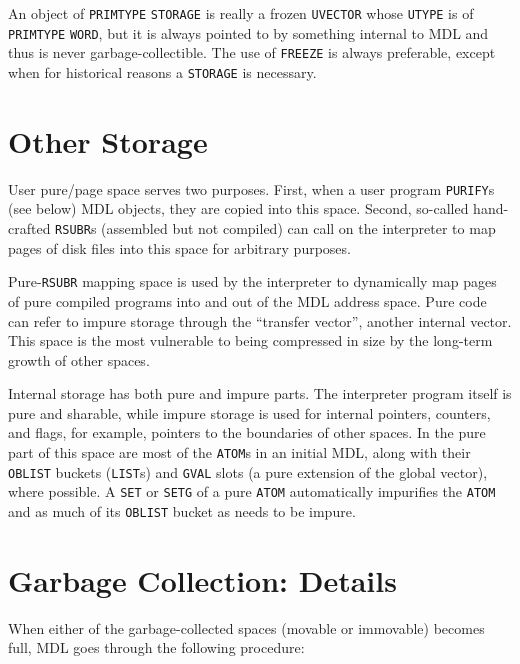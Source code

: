 \documentclass[a4paper]{scrbook}
\begin{document}
An object of \texttt{PRIMTYPE} \texttt{STORAGE} is really a frozen \texttt{UVECTOR} whose
\texttt{UTYPE} is of \texttt{PRIMTYPE} \texttt{WORD}, but it is always pointed to by something internal to MDL and thus is
never garbage-collectible. The use of \texttt{FREEZE} is always preferable, except when for historical reasons a
\texttt{STORAGE} is necessary.

\section{Other Storage}\label{other-storage}

User pure/page space serves two purposes. First, when a user program \texttt{PURIFY}s (see below)
MDL objects, they are copied into this space. Second, so-called hand-crafted \texttt{RSUBR}s
(assembled but not compiled) can call on the interpreter to map pages of disk files into this space for arbitrary purposes.

Pure-\texttt{RSUBR} mapping space is used by the interpreter to dynamically map pages of pure compiled programs into and
out of the MDL address space. Pure code can refer to impure storage through the ``transfer vector'', another internal
vector. This space is the most vulnerable to being compressed in size by the long-term growth of other spaces.

Internal storage has both pure and impure parts. The interpreter program itself is pure and sharable, while impure storage
is used for internal pointers, counters, and flags, for example, pointers to the boundaries of other spaces. In the pure
part of this space are most of the \texttt{ATOM}s in an initial MDL, along with their
\texttt{OBLIST} buckets (\texttt{LIST}s) and \texttt{GVAL} slots (a pure
extension of the global vector), where possible. A \texttt{SET} or \texttt{SETG}
of a pure \texttt{ATOM} automatically impurifies the \texttt{ATOM} and as much of its \texttt{OBLIST} bucket as needs to be
impure.

\section{Garbage Collection: Details}\label{garbage-collection-details}

When either of the garbage-collected spaces (movable or immovable) becomes full, MDL goes through the following procedure:
\end{document}
